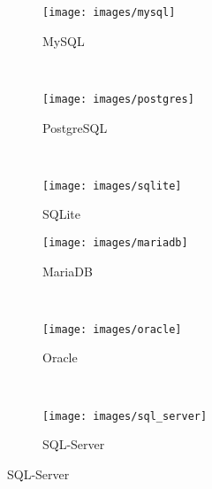 \begin{figure}[H]
	\centering
	\begin{subfigure}[b]{0.25\textwidth}
		\texttt{[image: images/mysql]}
		\caption{MySQL}
		\label{fig:mysql}
	\end{subfigure}
	~ 
	\begin{subfigure}[b]{0.25\textwidth}
		\texttt{[image: images/postgres]}
		\caption{PostgreSQL}
		\label{fig:postgresql}
	\end{subfigure}
	~ 
	\begin{subfigure}[b]{0.25\textwidth}
		\texttt{[image: images/sqlite]}
		\caption{SQLite}
		\label{fig:sqlite}
	\end{subfigure}
	
	\begin{subfigure}[b]{0.25\textwidth}
		\texttt{[image: images/mariadb]}
		\caption{MariaDB}
		\label{fig:mariadb}
	\end{subfigure}
	~ 
	\begin{subfigure}[b]{0.25\textwidth}
		\texttt{[image: images/oracle]}
		\caption{Oracle}
		\label{fig:oracle}
	\end{subfigure}
	~ 
	\begin{subfigure}[b]{0.25\textwidth}
		\texttt{[image: images/sql\_server]}
		\caption{SQL-Server}
		\label{fig:sqlserver}
	\end{subfigure}
\end{figure}